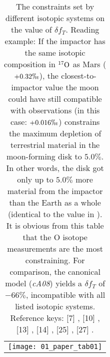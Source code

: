  
\begin{table}
\begin{tabular}{l}
\hspace{-0.8cm} \texttt{[image: 01\_paper\_tab01]}
\end{tabular}
\caption{The constraints set by different isotopic systems on the value of $\delta f_{T}$. Reading example: If the impactor has the same isotopic composition in $\O17$  as Mars ($+0.32 \permil$), the closest-to-impactor value the moon could have still compatible with observations (in this case: $+0.016 \permil$) constrains the maximum depletion of terrestrial material in the moon-forming disk to $5.0\%$. In other words, the disk got only up to $5.0\%$ more material from the impactor than the Earth as a whole (identical to the value in \citep{Wiechert:2001p3543}). It is obvious from this table that the O isotope measurements are the most constraining. For comparison, the canonical model (\emph{cA08}) yields a $\delta f_{T}$ of $-66\%$, incompatible with all listed isotopic systems. Reference keys: [7] \cite{Wiechert:2001p3543}, [10] \cite{2007Natur.447.1102G}, [13] \cite{2000SSRv...92..225S}, [14] \cite{2007Natur.450.1206T}, [25] \cite{2010LPI....41.2653F}, [27] \cite{2009GeCoA..73.5150K}.}
\label{ch05_tbl01}
\end{table}




